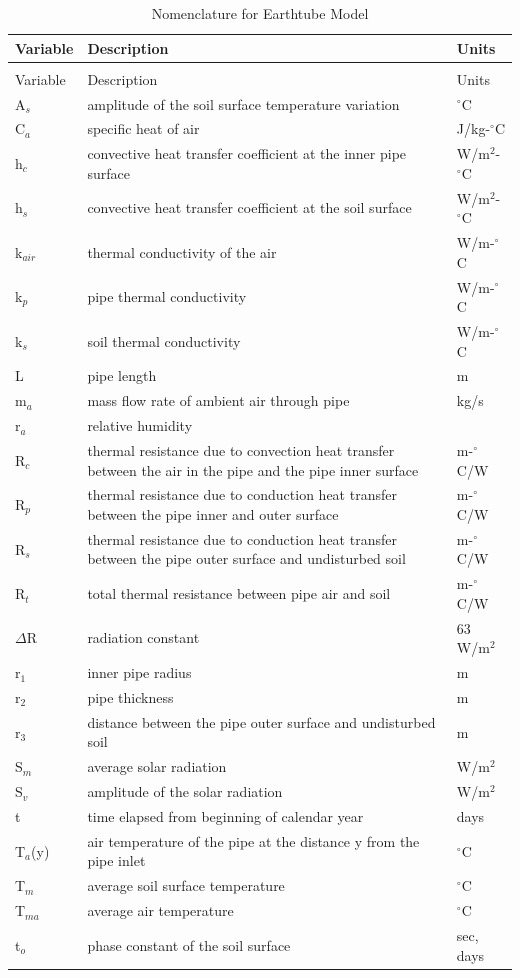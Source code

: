 \begin{longtable}[c]{p{1.5in}p{3.0in}p{1.5in}}
\caption{Nomenclature for Earthtube Model \label{table:nomenclature-for-earthtube-model}} \tabularnewline
\toprule 
Variable & Description & Units \tabularnewline
\midrule
\endfirsthead

\caption[]{Nomenclature for Earthtube Model} \tabularnewline
\toprule 
Variable & Description & Units \tabularnewline
\midrule
\endhead

A\(_{s}\) & amplitude of the soil surface temperature variation & \(^{\circ}\)C \tabularnewline
C\(_{a}\) & specific heat of air & J/kg-\(^{\circ}\)C \tabularnewline
h\(_{c}\) & convective heat transfer coefficient at the inner pipe surface & W/m\(^{2}\)-\(^{\circ}\)C \tabularnewline
h\(_{s}\) & convective heat transfer coefficient at the soil surface & W/m\(^{2}\)-\(^{\circ}\)C \tabularnewline
k\(_{air}\) & thermal conductivity of the air & W/m-\(^{\circ}\)C \tabularnewline
k\(_{p}\) & pipe thermal conductivity & W/m-\(^{\circ}\)C \tabularnewline
k\(_{s}\) & soil thermal conductivity & W/m-\(^{\circ}\)C \tabularnewline
L & pipe length & m \tabularnewline
m\(_{a}\) & mass flow rate of ambient air through pipe & kg/s \tabularnewline
r\(_{a}\) & relative humidity & ~ \tabularnewline
R\(_{c}\) & thermal resistance due to convection heat transfer between the air in the pipe and the pipe inner surface & m-\(^{\circ}\)C/W \tabularnewline
R\(_{p}\) & thermal resistance due to conduction heat transfer between the pipe inner and outer surface & m-\(^{\circ}\)C/W \tabularnewline
R\(_{s}\) & thermal resistance due to conduction heat transfer between the pipe outer surface and undisturbed soil & m-\(^{\circ}\)C/W \tabularnewline
R\(_{t}\) & total thermal resistance between pipe air and soil & m-\(^{\circ}\)C/W \tabularnewline
\({\Delta}\)R & radiation constant & 63 W/m\(^{2}\) \tabularnewline
r\(_{1}\) & inner pipe radius & m \tabularnewline
r\(_{2}\) & pipe thickness & m \tabularnewline
r\(_{3}\) & distance between the pipe outer surface and undisturbed soil & m \tabularnewline
S\(_{m}\) & average solar radiation & W/m\(^{2}\) \tabularnewline
S\(_{v}\) & amplitude of the solar radiation & W/m\(^{2}\) \tabularnewline
t & time elapsed from beginning of calendar year & days \tabularnewline
T\(_{a}\)(y) & air temperature of the pipe at the distance y from the pipe inlet & \(^{\circ}\)C \tabularnewline
T\(_{m}\) & average soil surface temperature & \(^{\circ}\)C \tabularnewline
T\(_{ma}\) & average air temperature & \(^{\circ}\)C \tabularnewline
t\(_{o}\) & phase constant of the soil surface & sec, days \tabularnewline

\end{longtable}
